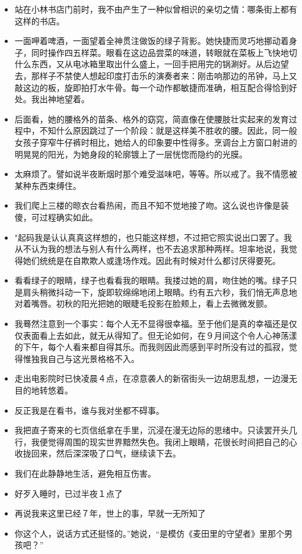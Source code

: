 \documentclass[UTF8,a4paper,8pt]{ctexbook}
\begin{document}
\begin{itemize}
		\item 站在小林书店门前时，我不由产生了一种似曾相识的亲切之情：哪条街上都有这样的书店。
		\item 一面呷着啤酒，一面望着全神贯注做饭的绿子背影。她快捷而灵巧地挪动着身子，同时操作四五样菜。眼看在这边品尝菜的味道，转眼就在菜板上飞快地切什么东西，又从电冰箱里取出什么盛上，一回手把用完的锅涮好。从后边望去，那样子不禁使人想起印度打击乐的演奏者来：刚击响那边的吊钟，马上又敲这边的板，旋即拍打水牛骨。每一个动作都敏捷而准确，相互配合得恰到好处。我出神地望着。
		\item 后面看，她的腰格外的苗条、格外的窈窕，简直像在使腰肢壮实起来的发育过程中，不知什么原因跳过了一个阶段：就是这样美不胜收的腰。因此，同一般女孩子穿窄牛仔裤时相比，她给人的印象要中性得多。烹调台上方窗口射进的明晃晃的阳光，为她身段的轮廓镀上了一层恍惚而隐约的光膜。
		\item 太麻烦了。譬如说半夜断烟时那个难受滋味吧，等等。所以戒了。我不情愿被某种东西束缚住。
		\item 我们爬上三楼的晾衣台看热闹，而且不知不觉地接了吻。这么说也许像是装傻，可过程确实如此。
		\item "起码我是认认真真这样想的，也只能这样想，不过把它照实说出口罢了。我从不认为我的想法与别人有什么两样，也不去追求那种两样。坦率地说，我觉得她们统统是在自欺欺人或逢场作戏。因此有时候对什么都讨厌得要死。
		\item 看看绿子的眼睛，绿子也看看我的眼睛。我搂过她的肩，吻住她的嘴。绿子只是肩头稍微抖动一下，旋即软绵绵地闭上眼睛。约有五六秒，我们悄无声息地对着嘴唇。初秋的阳光把她的眼睫毛投影在脸颊上，看上去微微发颤。
		\item 我蓦然注意到一个事实：每个人无不显得很幸福。至于他们是真的幸福还是仅仅表面看上去如此，就无从得知了。但无论如何，在９月间这个令人心神荡漾的下午，每个人看来都自得其乐。而我则因此而感到平时所没有过的孤寂，觉得惟独我自己与这光景格格不入。
		\item 走出电影院时已快凌晨４点，在凉意袭人的新宿街头一边胡思乱想，一边漫无目的地转悠着。
		\item 反正我是在看书，谁与我对坐都不碍事。
		\item 我把直子寄来的七页信纸拿在手里，沉浸在漫无边际的思绪中。只读罢开头几行，我便觉得周围的现实世界黯然失色。我闭上眼睛，花很长时间把自己的心收拢回来，然后深深吸了口气，继续读下去。
		\item 我们在此静静地生活，避免相互伤害。
		\item 好歹入睡时，已过半夜１点了
		\item 再说我来这里已经７年，世上的事，早就一无所知了
		\item 你这个人，说话方式还挺怪的。”她说，“是模仿《麦田里的守望者》里那个男孩吧？”

\end{itemize}
\end{document}
